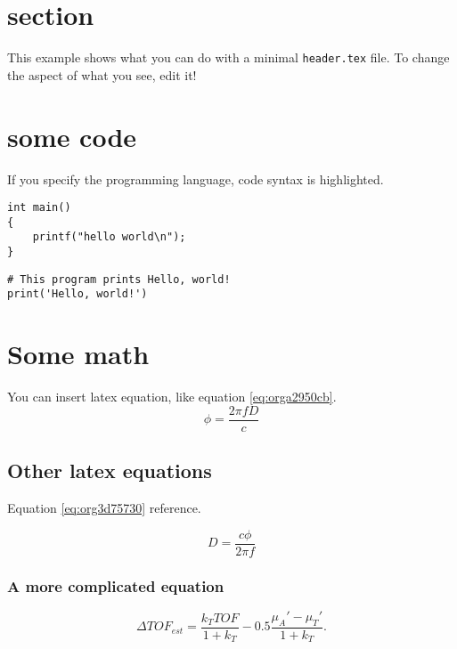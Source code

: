 


\maketitle

\newpage

\section{section}
\label{sec:org7b61135}
This example shows what you can do with a minimal \texttt{header.tex} file.
To change the aspect of what you see, edit it!

\section{some code}
\label{sec:orgdd0bf12}
If you specify the programming language, code syntax is highlighted.
\begin{verbatim}
int main()
{
    printf("hello world\n");
}
\end{verbatim}

\begin{verbatim}
# This program prints Hello, world!
print('Hello, world!')
\end{verbatim}

\section{Some math}
\label{sec:orgf3a1f48}
You can insert latex equation, like equation \ref{eq:orga2950cb}.
\begin{equation}
\label{eq:orga2950cb}
\phi = \frac{2\pi fD}{c}
\end{equation}
\subsection{Other latex equations}
\label{sec:orgf9c2066}
Equation \ref{eq:org3d75730} reference.

\begin{equation}
\label{eq:org3d75730}
D = \frac{c\phi}{2\pi f}
\end{equation}

\subsubsection{A more complicated equation}
\label{sec:org39aea35}

\begin{equation}
\Delta TOF_{est} = \frac{k_T TOF}{1+k_T } - 0.5 \frac{\mu_A' - \mu_T'}{1+k_T}.
\end{equation}

